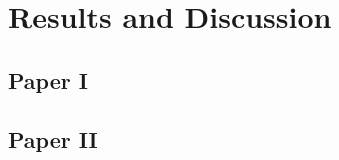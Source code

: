 \chapter[Results and Discussion]{Results and Discussion}\label{ch:results}


\noindent \kant[21]

\section*{Paper I}\label{sec:results-paper-one}

\kant[22-23]

\section*{Paper II}\label{sec:results-paper-two}

\kant[24]
